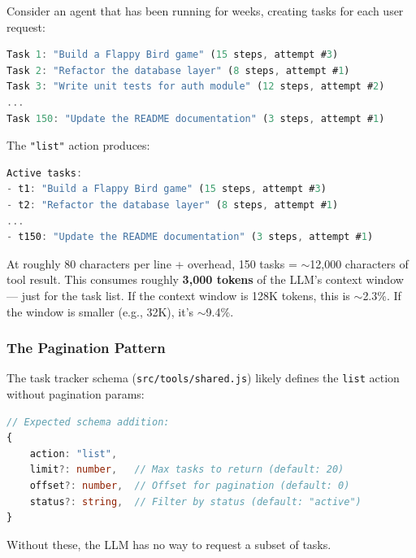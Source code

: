 Consider an agent that has been running for weeks, creating tasks for each user request:



\begin{lstlisting}[language=TypeScript]
Task 1: "Build a Flappy Bird game" (15 steps, attempt #3)
Task 2: "Refactor the database layer" (8 steps, attempt #1)
Task 3: "Write unit tests for auth module" (12 steps, attempt #2)
...
Task 150: "Update the README documentation" (3 steps, attempt #1)

\end{lstlisting}



The \texttt{"list"} action produces:



\begin{lstlisting}[language=TypeScript]
Active tasks:
- t1: "Build a Flappy Bird game" (15 steps, attempt #3)
- t2: "Refactor the database layer" (8 steps, attempt #1)
...
- t150: "Update the README documentation" (3 steps, attempt #1)

\end{lstlisting}



At roughly 80 characters per line + overhead, 150 tasks = $\sim$12,000 characters of tool result. This consumes roughly \textbf{3,000 tokens} of the LLM's context window — just for the task list. If the context window is 128K tokens, this is $\sim$2.3\%. If the window is smaller (e.g., 32K), it's $\sim$9.4\%.

\subsubsection*{The Pagination Pattern}

The task tracker schema (\texttt{src/tools/shared.js}) likely defines the \texttt{list} action without pagination params:



\begin{lstlisting}[language=TypeScript]
// Expected schema addition:
{
    action: "list",
    limit?: number,   // Max tasks to return (default: 20)
    offset?: number,  // Offset for pagination (default: 0)
    status?: string,  // Filter by status (default: "active")
}

\end{lstlisting}



Without these, the LLM has no way to request a subset of tasks.


